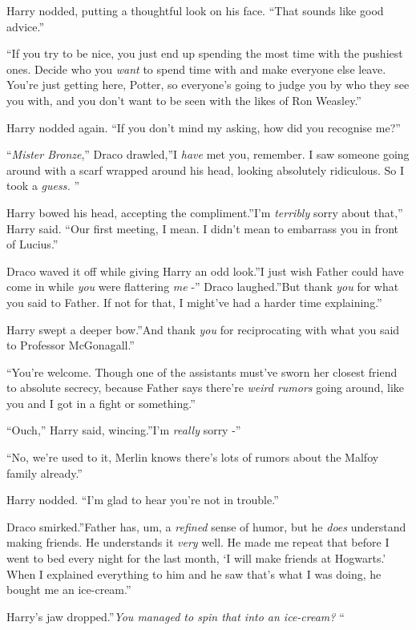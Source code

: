 Harry nodded, putting a thoughtful look on his face. ``That sounds like
good advice.''

``If you try to be nice, you just end up spending the most time with the
pushiest ones. Decide who you \emph{want} to spend time with and make
everyone else leave. You're just getting here, Potter, so everyone's
going to judge you by who they see you with, and you don't want to be
seen with the likes of Ron Weasley.''

Harry nodded again. ``If you don't mind my asking, how did you recognise
me?''

``\emph{Mister Bronze},'' Draco drawled,''I \emph{have} met you,
remember. I saw someone going around with a scarf wrapped around his
head, looking absolutely ridiculous. So I took a \emph{guess.} ''

Harry bowed his head, accepting the compliment.''I'm \emph{terribly}
sorry about that,'' Harry said. ``Our first meeting, I mean. I didn't
mean to embarrass you in front of Lucius.''

Draco waved it off while giving Harry an odd look.''I just wish Father
could have come in while \emph{you} were flattering \emph{me} -'' Draco
laughed.''But thank \emph{you} for what you said to Father. If not for
that, I might've had a harder time explaining.''

Harry swept a deeper bow.''And thank \emph{you} for reciprocating with
what you said to Professor McGonagall.''

``You're welcome. Though one of the assistants must've sworn her closest
friend to absolute secrecy, because Father says there're \emph{weird
rumors} going around, like you and I got in a fight or something.''

``Ouch,'' Harry said, wincing.''I'm \emph{really} sorry -''

``No, we're used to it, Merlin knows there's lots of rumors about the
Malfoy family already.''

Harry nodded. ``I'm glad to hear you're not in trouble.''

Draco smirked.''Father has, um, a \emph{refined} sense of humor, but he
\emph{does} understand making friends. He understands it \emph{very}
well. He made me repeat that before I went to bed every night for the
last month, `I will make friends at Hogwarts.' When I explained
everything to him and he saw that's what I was doing, he bought me an
ice-cream.''

Harry's jaw dropped.''\emph{You managed to spin that into an ice-cream?}
``

